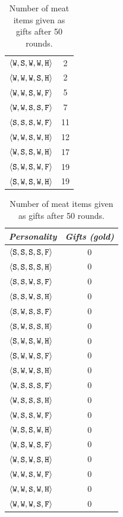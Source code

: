 \begin{table}
{{\begin{minipage}[b]{0.30\hsize}
\begin{tabular}{ l | c }
					$\personality{W}{S}{W}{W}{H}$ & 2\\
					$\personality{W}{W}{W}{S}{H}$ & 2\\
					$\personality{W}{W}{S}{W}{F}$ & 5\\
					$\personality{W}{W}{S}{S}{F}$ & 7\\
					$\personality{S}{S}{S}{W}{F}$ & 11\\
					$\personality{W}{W}{S}{W}{H}$ & 12\\
					$\personality{W}{S}{S}{W}{H}$ & 17\\
					$\personality{S}{W}{S}{W}{F}$ & 19\\
					$\personality{S}{W}{S}{W}{H}$ & 19\\
				\end{tabular}
				\caption{Number of meat items given as gifts after 50 rounds.}
				\label{tab:numMeatGiven}
			\end{minipage}
			\hfill
			\begin{minipage}[b]{0.30\hsize}\centering
				\begin{tabular}{ l | c }
					\emph{Personality} & \emph{Gifts (gold)} \\
					\hline
					$\personality{S}{S}{S}{S}{F}$ & 0\\
					$\personality{S}{S}{S}{S}{H}$ & 0\\
					$\personality{S}{S}{W}{S}{F}$ & 0\\
					$\personality{S}{S}{W}{S}{H}$ & 0\\
					$\personality{S}{W}{S}{S}{F}$ & 0\\
					$\personality{S}{W}{S}{S}{H}$ & 0\\
					$\personality{S}{W}{S}{W}{H}$ & 0\\
					$\personality{S}{W}{W}{S}{F}$ & 0\\
					$\personality{S}{W}{W}{S}{H}$ & 0\\
					$\personality{W}{S}{S}{S}{F}$ & 0\\
					$\personality{W}{S}{S}{S}{H}$ & 0\\
					$\personality{W}{S}{S}{W}{F}$ & 0\\
					$\personality{W}{S}{S}{W}{H}$ & 0\\
					$\personality{W}{S}{W}{S}{F}$ & 0\\
					$\personality{W}{S}{W}{S}{H}$ & 0\\
					$\personality{W}{W}{S}{W}{F}$ & 0\\
					$\personality{W}{W}{S}{W}{H}$ & 0\\
					$\personality{W}{W}{W}{S}{F}$ & 0\\

\end{tabular}
\end{minipage}}}
\end{table}
